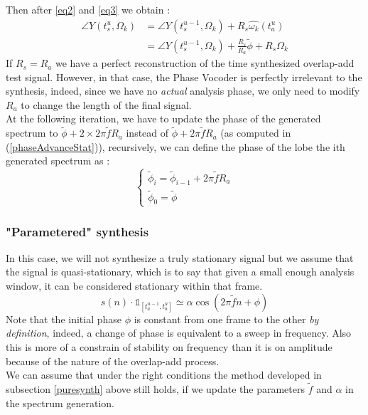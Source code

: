 \documentclass[]{article}
\begin{document}
Then after \ref{eq2} and \ref{eq3} we obtain :
\begin{equation*}
\begin{split}
\angle Y(t_s^u, \Omega_k) & = \angle Y(t_s^{u-1}, \Omega_k) + R_s \hat{\omega_k}(t_a^u)\\
& = \angle Y(t_s^{u-1}, \Omega_k) + \frac{R_s}{R_a}\tilde{\phi} + R_s\Omega_k
\end{split}
\end{equation*}
If $R_s = R_a$ we have a perfect reconstruction of the time synthesized overlap-add test signal. However, in that case, the Phase Vocoder is perfectly irrelevant to the synthesis, indeed, since we have no \emph{actual} analysis phase, we only need to modify $R_a$ to change the length of the final signal.\\
At the following iteration, we have to update the phase of the generated spectrum to $\tilde{\phi} + 2\times2\pi \tilde{f} R_a$ instead of $\tilde{\phi} + 2\pi \tilde{f} R_a$ (as computed in (\ref{phaseAdvanceStat})), recursively, we can define the phase of the lobe the ith generated spectrum as :
\begin{equation}
\begin{cases}
\tilde{\phi}_i = \tilde{\phi}_{i-1} + 2\pi \tilde{f} R_a \\
\tilde{\phi}_0 = \tilde{\phi}
\end{cases}
\end{equation}
\subsubsection{"Parametered" synthesis}
In this case, we will not synthesize a truly stationary signal but we assume that the signal is quasi-stationary, which is to say that given a small enough analysis window, it can be considered stationary within that frame.
\begin{equation}
s(n)\cdot \mathds{1}_{[t_a^{u-1}, t_a^u]} \simeq \alpha \cos(2\pi\tilde{f} n + \phi)
\end{equation}
Note that the initial phase $\phi$ is constant from one frame to the other \emph{by definition}, indeed, a change of phase is equivalent to a sweep in frequency. Also this is more of a constrain of stability on frequency than it is on amplitude because of the nature of the overlap-add process.\\
We can assume that under the right conditions the method developed in subsection \ref{puresynth} above still holds, if we update the parameters $\tilde{f}$ and $\alpha$ in the spectrum generation.
\end{document}
